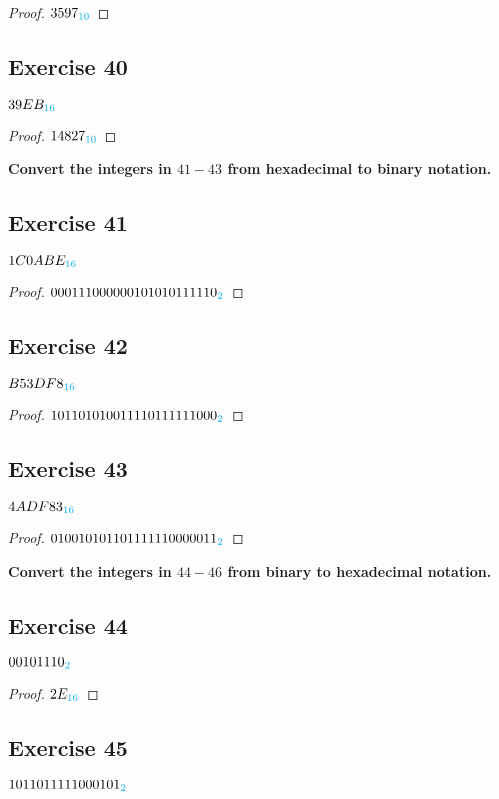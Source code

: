 \documentclass[14pt]{extarticle}
\newcommand{\base}[1]{{\color{cyan}#1}}
\begin{document}
\begin{proof}
    $3597_\base{10}$
\end{proof}

\subsection{Exercise 40}
$39EB_\base{16}$

\begin{proof}
    $14827_\base{10}$
\end{proof}

{\bf \color{cyan} Convert the integers in $41-43$ from hexadecimal to binary notation.}

\subsection{Exercise 41}
$1C0ABE_\base{16}$

\begin{proof}
    $000111000000101010111110_\base{2}$
\end{proof}

\subsection{Exercise 42}
$B53DF8_\base{16}$

\begin{proof}
    $101101010011110111111000_\base{2}$
\end{proof}

\subsection{Exercise 43}
$4ADF83_\base{16}$

\begin{proof}
    $010010101101111110000011_\base{2}$
\end{proof}

{\bf \color{cyan} Convert the integers in $44-46$ from binary to hexadecimal notation.}

\subsection{Exercise 44}
$00101110_\base{2}$

\begin{proof}
    $2E_\base{16}$
\end{proof}

\subsection{Exercise 45}
$1011011111000101_\base{2}$
\end{document}

